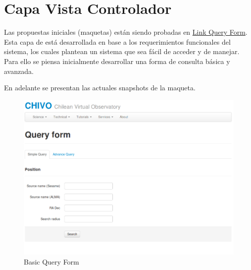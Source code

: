 \section{Capa Vista Controlador}

Las propuestas iniciales (maquetas) están siendo probadas en
\href{http://chivoalpha.herokuapp.com/query}{Link Query Form}. Esta capa de
está desarrollada en base a los requerimientos funcionales del sistema, los
cuales plantean un sistema que sea fácil de acceder y de manejar. Para ello se
piensa inicialmente desarrollar una forma de consulta básica y avanzada. 

En adelante se presentan las actuales snapshots de la
maqueta.

\begin{figure}[h!t]
         \begin{center}
                 \includegraphics[width=0.8\textheight]{img/snap1.png}
                 \caption{Basic Query Form}
         \end{center}
\end{figure}

\newpage

